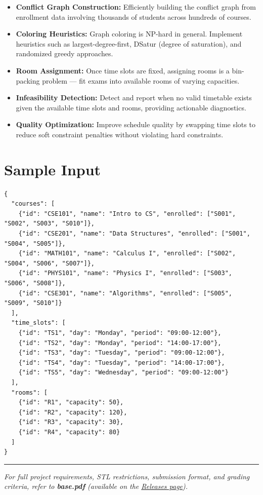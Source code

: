 \begin{itemize}
  \item \textbf{Conflict Graph Construction:} Efficiently building the conflict graph from enrollment data involving thousands of students across hundreds of courses.
  \item \textbf{Coloring Heuristics:} Graph coloring is NP-hard in general. Implement heuristics such as largest-degree-first, DSatur (degree of saturation), and randomized greedy approaches.
  \item \textbf{Room Assignment:} Once time slots are fixed, assigning rooms is a bin-packing problem --- fit exams into available rooms of varying capacities.
  \item \textbf{Infeasibility Detection:} Detect and report when no valid timetable exists given the available time slots and rooms, providing actionable diagnostics.
  \item \textbf{Quality Optimization:} Improve schedule quality by swapping time slots to reduce soft constraint penalties without violating hard constraints.
\end{itemize}

\section{Sample Input}

\begin{lstlisting}[style=json, caption={data/input\_sample.json}]
{
  "courses": [
    {"id": "CSE101", "name": "Intro to CS", "enrolled": ["S001", "S002", "S003", "S010"]},
    {"id": "CSE201", "name": "Data Structures", "enrolled": ["S001", "S004", "S005"]},
    {"id": "MATH101", "name": "Calculus I", "enrolled": ["S002", "S004", "S006", "S007"]},
    {"id": "PHYS101", "name": "Physics I", "enrolled": ["S003", "S006", "S008"]},
    {"id": "CSE301", "name": "Algorithms", "enrolled": ["S005", "S009", "S010"]}
  ],
  "time_slots": [
    {"id": "TS1", "day": "Monday", "period": "09:00-12:00"},
    {"id": "TS2", "day": "Monday", "period": "14:00-17:00"},
    {"id": "TS3", "day": "Tuesday", "period": "09:00-12:00"},
    {"id": "TS4", "day": "Tuesday", "period": "14:00-17:00"},
    {"id": "TS5", "day": "Wednesday", "period": "09:00-12:00"}
  ],
  "rooms": [
    {"id": "R1", "capacity": 50},
    {"id": "R2", "capacity": 120},
    {"id": "R3", "capacity": 30},
    {"id": "R4", "capacity": 80}
  ]
}
\end{lstlisting}

\vfill
\noindent\rule{\textwidth}{0.4pt}
{\small\textit{For full project requirements, STL restrictions, submission format, and grading criteria, refer to \textbf{base.pdf} (available on the \href{https://github.com/BestSithInEU/cse211-term-projects/releases}{Releases page}).}}
